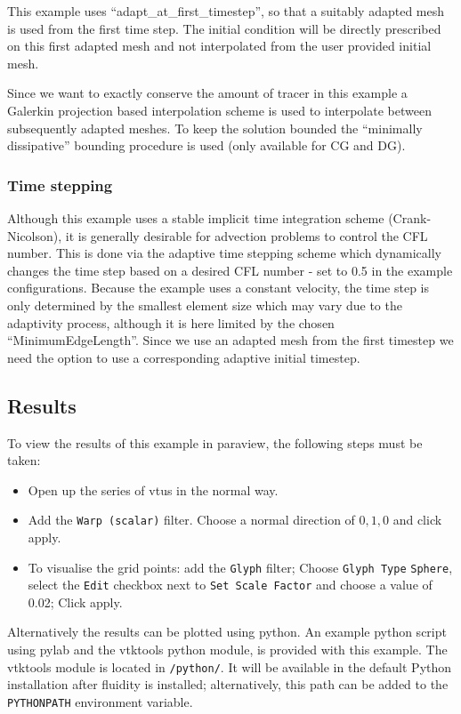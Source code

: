 This example uses ``adapt\_at\_first\_timestep'', so that a suitably
adapted mesh is used from the first time step. The initial condition
will be directly prescribed on this first adapted mesh and not interpolated
from the user provided initial mesh.

Since we want to exactly conserve the amount of tracer in this example
a Galerkin projection based interpolation scheme is used to interpolate
between subsequently adapted meshes. To keep the solution bounded the
``minimally dissipative'' bounding procedure is used (only available for CG and DG).

\subsubsection{Time stepping}
Although this example uses a stable implicit time integration scheme (Crank-Nicolson),
it is generally desirable for advection problems to control the CFL number. This is done
via the adaptive time stepping scheme which dynamically changes the time
step based on a desired CFL number - set to 0.5 in the example configurations. Because the
example uses a constant velocity, the time step is only determined by the smallest
element size which may vary due to the adaptivity process, although it is here
limited by the chosen ``MinimumEdgeLength''. Since we use an adapted mesh from the first
timestep we need the option  to use a corresponding
adaptive initial timestep.

\subsection{Results}
To view the results of this example in paraview, the following steps
must be taken:
\begin{itemize}
\item Open up the series of vtus in the normal way.
\item Add the \texttt{Warp (scalar)} filter. Choose a normal direction of $0,1,0$ and click apply.
\item To visualise the grid points: add the \texttt{Glyph} filter; Choose \texttt{Glyph Type} \texttt{Sphere},
select the \texttt{Edit} checkbox next to \texttt{Set Scale Factor} and choose a value of 0.02; Click apply.
\end{itemize}

Alternatively the results can be plotted using python. An example python script using pylab and the
vtktools python module, is provided with this example. The vtktools module is located in
\texttt{\fluiditysourcepath/python/}. It will be available in the default Python installation after
fluidity is installed; alternatively, this path can be added to the \texttt{PYTHONPATH} environment
variable.

